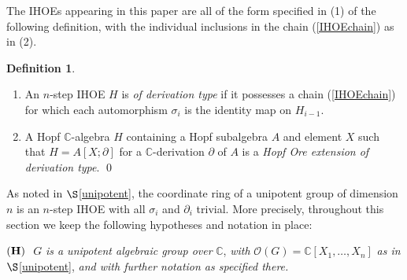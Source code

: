 \documentclass{amsart}
\numberwithin{equation}{section}
\theoremstyle{definition}
\newtheorem{definition}[theorem]{Definition}
\begin{document}
The IHOEs appearing in this paper are all of the form specified in (1) of the following definition, with the individual inclusions in the chain (\ref{IHOEchain}) as in (2).

\begin{definition}\label{dertype}\begin{enumerate}
\item An $n$-step IHOE $H$ is \emph{of derivation type} if it possesses a chain (\ref{IHOEchain}) for which each automorphism $\sigma_i$ is the identity map on $H_{i-1}$. 
\item A Hopf $\mathbb{C}$-algebra $H$ containing a Hopf subalgebra $A$ and element $X$ such that $H = A[X;\partial]$ for a $\mathbb{C}$-derivation $\partial$ of $A$ is a \emph{Hopf Ore extension of derivation type}. \qed
\end{enumerate} 
\end{definition}

As noted in $\S$\ref{unipotent}, the coordinate ring of a unipotent group of dimension $n$ is an $n$-step IHOE with all $\sigma_i$ and $\partial_i$ trivial. More precisely, throughout this section we keep the following hypotheses and notation in place:

\medskip

${\bf (H)}\,\,$  $G$ \textit{is a unipotent algebraic group over} $\mathbb{C}$, \textit{with} $ \mathcal{O}(G) = \mathbb{C}[X_1, \ldots , X_n]$ \textit{as in} $\S$\ref{unipotent}, \textit{and with further notation as specified there.}
\end{document}
